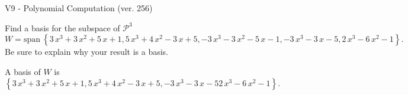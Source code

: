 \begin{exercise}
  \begin{exerciseTitle}V9 - Polynomial Computation (ver. 256)\end{exerciseTitle}
  \begin{exerciseStatement}
    Find a basis for the subspace of \(\mathcal{P}^3\) 
\[W=\mathrm{span}\ \left\{3 \, x^{3} + 3 \, x^{2} + 5 \, x + 1 , 5 \, x^{3} + 4 \, x^{2} - 3 \, x + 5 , -3 \, x^{3} - 3 \, x^{2} - 5 \, x - 1 , -3 \, x^{3} - 3 \, x - 5 , 2 \, x^{3} - 6 \, x^{2} - 1\right\}.\]
 Be sure to explain why your result is a basis.


  \end{exerciseStatement}
  \begin{exerciseAnswer}
   A basis of \(W\) is  \(\left\{3 \, x^{3} + 3 \, x^{2} + 5 \, x + 1 , 5 \, x^{3} + 4 \, x^{2} - 3 \, x + 5 , -3 \, x^{3} - 3 \, x - 5 2 \, x^{3} - 6 \, x^{2} - 1\right\}\).
  


  \end{exerciseAnswer}
\end{exercise}